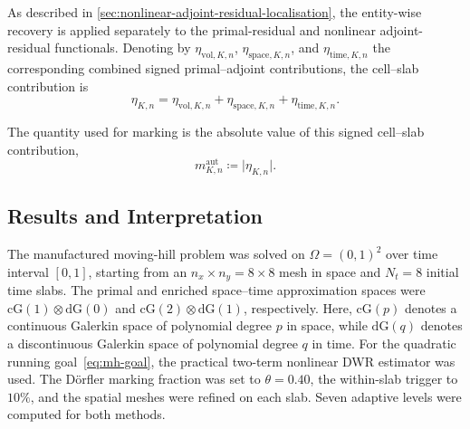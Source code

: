 As described in \cref{sec:nonlinear-adjoint-residual-localisation}, the entity-wise recovery is applied separately to the primal-residual and nonlinear adjoint-residual functionals. Denoting by $\eta_{\mathrm{vol},K,n}$, $\eta_{\mathrm{space},K,n}$, and $\eta_{\mathrm{time},K,n}$ the corresponding combined signed
primal--adjoint contributions, the cell--slab contribution is
\begin{equation*}
\eta_{K,n}
=
\eta_{\mathrm{vol},K,n}
+
\eta_{\mathrm{space},K,n}
+
\eta_{\mathrm{time},K,n}.
\end{equation*}

The quantity used for marking is the absolute value of this signed
cell--slab contribution,
\begin{equation*}
m_{K,n}^{\mathrm{aut}}
\coloneqq
\lvert \eta_{K,n} \rvert .
\end{equation*}


\subsection{Results and Interpretation}

The manufactured moving-hill problem was solved on $\Omega=(0,1)^2$ over time interval $[0,1]$, starting from an $n_x \times n_y = 8 \times 8$ mesh in space and $N_t=8$ initial time slabs.
The primal and enriched space–time approximation spaces were \(\mathrm{cG}(1)\otimes\mathrm{dG}(0)\) and \(\mathrm{cG}(2)\otimes\mathrm{dG}(1)\), respectively. Here, \(\mathrm{cG}(p)\) denotes a continuous Galerkin space of polynomial degree \(p\) in space, while \(\mathrm{dG}(q)\) denotes a discontinuous Galerkin space of polynomial degree \(q\) in time.
For the quadratic running goal~\eqref{eq:mh-goal}, the practical two-term nonlinear DWR estimator was used. The D\"orfler marking fraction was set to $\theta=0.40$, the within-slab trigger to $10\%$, and the spatial meshes were refined on each slab. Seven adaptive levels were computed for both methods.

